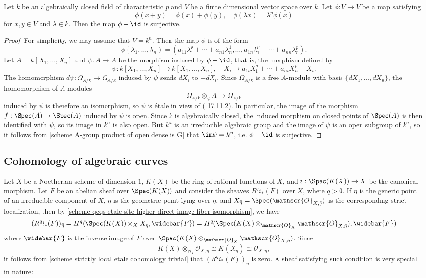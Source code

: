 \begin{lemma}\label{scheme morphism phi-id surjective if p-homogeneous}
Let $k$ be an algebraically closed field of characteristic $p$ and $V$ be a finite dimensional vector space over $k$. Let $\phi:V\to V$ be a map satisfying
\[\phi(x+y)=\phi(x)+\phi(y),\quad \phi(\lambda x)=\lambda^p\phi(x)\]
for $x,y\in V$ and $\lambda\in k$. Then the map $\phi-\id$ is surjective.
\end{lemma}
\begin{proof}
For simplicity, we may assume that $V=k^n$. Then the map $\phi$ is of the form
\[\phi(\lambda_1,\dots,\lambda_n)=(a_{11}\lambda_1^p+\cdots+a_{n1}\lambda_n^1,\dots,a_{1n}\lambda_1^p+\cdots+a_{nn}\lambda_n^p).\]
Let $A=k[X_1,\dots,X_n]$ and $\psi:A\to A$ be the morphism induced by $\phi-\id$, that is, the morphism defined by
\[\psi:k[X_1,\dots,X_n]\to k[X_1,\dots,X_n],\quad X_i\mapsto a_{1i}X_1^p+\cdots+a_{ni}X_n^p-X_i.\]
The homomorphism $d\psi:\Omega_{A/k}\to\Omega_{A/k}$ induced by $\psi$ sends $dX_i$ to $-dX_i$. Since $\Omega_{A/k}$ is a free $A$-module with basis $\{dX_1,\dots,dX_n\}$, the homomorphism of $A$-modules
\[\Omega_{A/k}\otimes_{\psi}A\to\Omega_{A/k}\]
induced by $\psi$ is therefore an isomorphism, so $\psi$ is \'etale in view of (\cite{EGA4-4} 17.11.2). In particular, the image of the morphism $f:\Spec(A)\to\Spec(A)$ induced by $\psi$ is open. Since $k$ is algebraically closed, the induced morphism on closed points of $\Spec(A)$ is then identified with $\psi$, so its image in $k^n$ is also open. But $k^n$ is an irreducible algebraic group and the image of $\psi$ is an open subgroup of $k^n$, so it follows from \cref{scheme A-group product of open dense is G} that $\im\psi=k^n$, i.e. $\phi-\id$ is surjective.
\end{proof}

\subsection{Cohomology of algebraic curves}
Let $X$ be a Noetherian scheme of dimension $1$, $K(X)$ be the ring of rational functions of $X$, and $i:\Spec(K(X))\to X$ be the canonical morphism. Let $F$ be an abelian sheaf over $\Spec(K(X))$ and consider the sheaves $R^qi_*(F)$ over $X$, where $q>0$. If $\eta$ is the generic point of an irreducible component of $X$, $\bar{\eta}$ is the geometric point lying over $\eta$, and $X_{\bar{\eta}}=\Spec(\mathscr{O}_{X,\bar{\eta}})$ is the corresponding strict localization, then by \cref{scheme qcqs etale site higher direct image fiber isomorphism}, we have
\[(R^qi_*(F))_{\bar{\eta}}=H^q(\Spec(K(X))\times_XX_\eta,\widebar{F})=H^q(\Spec(K(X)\otimes_{\mathscr{O}_X}\mathscr{O}_{X,\bar{\eta}}),\widebar{F})\]
where $\widebar{F}$ is the inverse image of $F$ over $\Spec(K(X)\otimes_{\mathscr{O}_X}\mathscr{O}_{X,\bar{\eta}})$. Since
\[K(X)\otimes_{\mathscr{O}_X}\mathscr{O}_{X,\bar{\eta}}\cong K(X_{\bar{\eta}})\cong \mathscr{O}_{X,\bar{\eta}},\]
it follows from \cref{scheme strictly local etale cohomology trivial} that $(R^qi_*(F))_{\bar{\eta}}$ is zero. A sheaf satisfying such condition is very special in nature:

